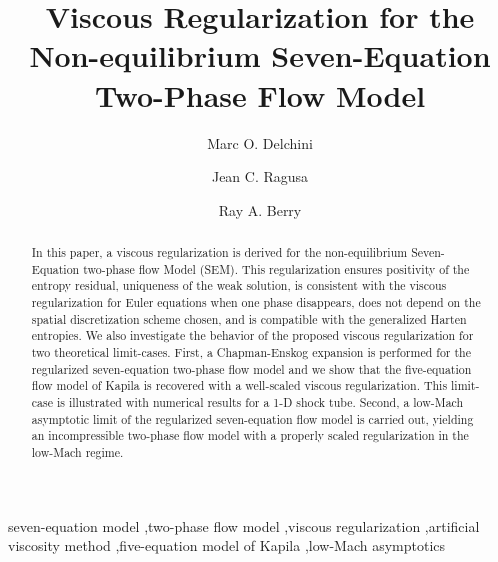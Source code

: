 \documentclass[preprint,10pt]{elsarticle}
\begin{document}
\begin{frontmatter}
\title{Viscous Regularization for the Non-equilibrium Seven-Equation Two-Phase Flow Model}
\author{Marc O. Delchini}
%
\author{Jean C. Ragusa}
%
\author{Ray A. Berry}
%
\address[label1]{Department of Nuclear Engineering, Texas A\&M University, College Station, TX 77843, USA }
%
\address[label2]{Idaho National Laboratory, Idaho Falls, ID 83415, USA }
%
\begin{abstract}
In this paper, a viscous regularization is derived for the non-equilibrium Seven-Equation two-phase flow Model (SEM). This regularization ensures positivity of the entropy 
residual, uniqueness of the weak solution, is consistent with the viscous regularization for Euler equations when one phase disappears, does not depend on the spatial discretization scheme 
chosen, and is compatible with the generalized Harten entropies. We also investigate the behavior of the proposed viscous regularization for two 
theoretical limit-cases. First, a Chapman-Enskog expansion is performed for the regularized seven-equation two-phase flow model and we show that the five-equation flow 
model of Kapila is recovered with a well-scaled viscous regularization. This limit-case is illustrated with numerical results for a 1-D shock tube. Second, a low-Mach asymptotic limit of the regularized seven-equation flow model is carried out, yielding an incompressible two-phase flow model with a properly scaled regularization in the low-Mach regime.
\end{abstract}
\begin{keyword}
seven-equation model \sep two-phase flow model \sep viscous regularization \sep artificial viscosity method \sep five-equation model of Kapila \sep low-Mach asymptotics 
\end{keyword}
\end{frontmatter}
%
\linenumbers
%
\end{document}
